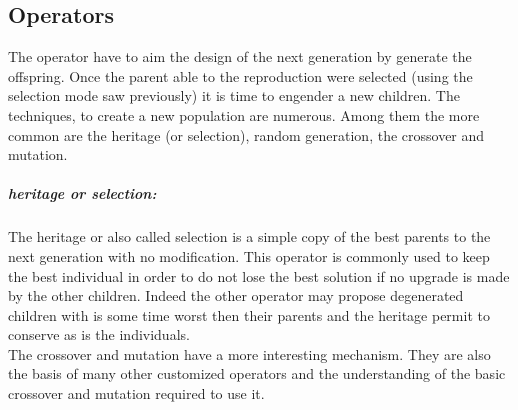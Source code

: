 %


%	
\subsection{Operators }


The operator have to aim the design of the next generation by generate the offspring. 
Once the parent able to the reproduction were selected (using the selection mode saw previously) it is time to engender a new children.
The techniques, to create a new population are numerous. Among them the more common  are the heritage (or selection), random generation, the crossover and mutation. 

\subparagraph{heritage or selection:}
The heritage or also called selection is a simple copy of the best parents to the next generation with no modification. This operator is commonly used to keep the best individual in order to do not lose the best solution if no upgrade is made by the other children. Indeed the other operator may propose degenerated children with is some time worst then their parents and the heritage  permit to conserve as is the individuals.
\\
The crossover and mutation have a more interesting mechanism. They are also the basis of many other customized operators and the understanding of the basic crossover and mutation required to use it.
 

